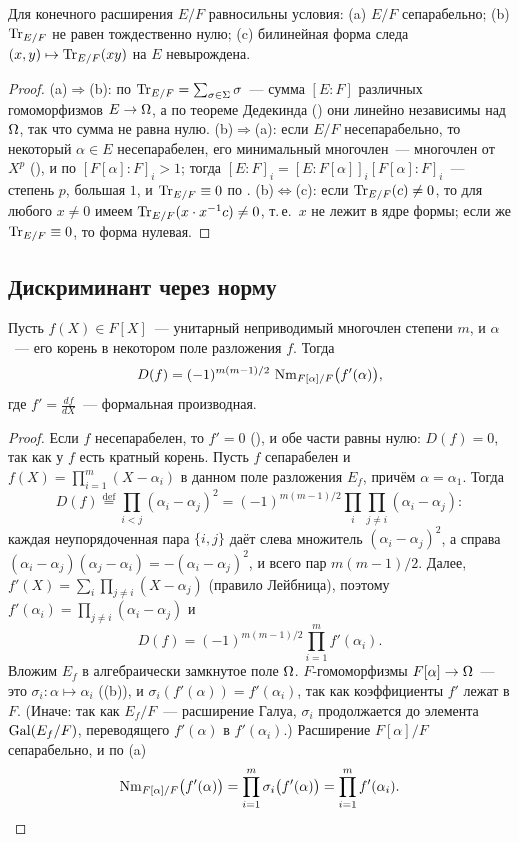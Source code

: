 \begin{corollary}[5.48c]
Для конечного расширения $E/F$ равносильны условия: (a) $E/F$ сепарабельно; (b) $\operatorname{Tr}_{E/F}$ не равен тождественно
нулю; (c) билинейная форма следа $(x,y)\mapsto\operatorname{Tr}_{E/F}(xy)$ на $E$ невырождена.
\end{corollary}

\begin{proof}
(a)$\Rightarrow$(b): по  $\operatorname{Tr}_{E/F}=\sum_{\sigma\in\Sigma}\sigma$~--- сумма $[E:F]$ различных гомоморфизмов
$E\to\Omega$, а по теореме Дедекинда () они линейно независимы над $\Omega$, так что сумма не равна нулю. (b)$\Rightarrow$(a):
если $E/F$ несепарабельно, то некоторый $\alpha\in E$ несепарабелен, его минимальный многочлен~--- многочлен от $X^p$
(), и по  $[F[\alpha]:F]_i>1$; тогда $[E:F]_i=[E:F[\alpha]]_i[F[\alpha]:F]_i$~--- степень $p$, большая $1$,
и $\operatorname{Tr}_{E/F}\equiv0$ по . (b)$\Leftrightarrow$(c): если $\operatorname{Tr}_{E/F}(c)\ne0$, то для любого $x\ne0$ имеем
$\operatorname{Tr}_{E/F}(x\cdot x^{-1}c)\ne0$, т.\,е.\ $x$ не лежит в ядре формы; если же $\operatorname{Tr}_{E/F}\equiv0$, то форма нулевая.
\end{proof}

\subsection*{Дискриминант через норму}

\begin{proposition}[5.49]
Пусть $f(X)\in F[X]$~--- унитарный неприводимый многочлен степени $m$, и $\alpha$~--- его корень в некотором поле
разложения $f$. Тогда
\[
D(f)=(-1)^{m(m-1)/2}\,\operatorname{Nm}_{F[\alpha]/F}\bigl(f'(\alpha)\bigr),
\]
где $f'=\frac{df}{dX}$~--- формальная производная.
\end{proposition}

\begin{proof}
Если $f$ несепарабелен, то $f'=0$ (), и обе части равны нулю: $D(f)=0$, так как у $f$ есть кратный корень. Пусть
$f$ сепарабелен и $f(X)=\prod_{i=1}^m(X-\alpha_i)$ в данном поле разложения $E_f$, причём $\alpha=\alpha_1$. Тогда
\[
D(f)\overset{\mathrm{def}}{=}\prod_{i<j}(\alpha_i-\alpha_j)^2=(-1)^{m(m-1)/2}\prod_i\prod_{j\ne i}(\alpha_i-\alpha_j):
\]
каждая неупорядоченная пара $\{i,j\}$ даёт слева множитель $(\alpha_i-\alpha_j)^2$, а справа
$(\alpha_i-\alpha_j)(\alpha_j-\alpha_i)=-(\alpha_i-\alpha_j)^2$, и всего пар $m(m-1)/2$. Далее,
$f'(X)=\sum_i\prod_{j\ne i}(X-\alpha_j)$ (правило Лейбница), поэтому $f'(\alpha_i)=\prod_{j\ne i}(\alpha_i-\alpha_j)$ и
\[
D(f)=(-1)^{m(m-1)/2}\prod_{i=1}^mf'(\alpha_i).
\]
Вложим $E_f$ в алгебраически замкнутое поле $\Omega$. $F$-гомоморфизмы $F[\alpha]\to\Omega$~--- это $\sigma_i\colon\alpha\mapsto\alpha_i$
((b)), и $\sigma_i(f'(\alpha))=f'(\alpha_i)$, так как коэффициенты $f'$ лежат в $F$. (Иначе: так как $E_f/F$~---
расширение Галуа, $\sigma_i$ продолжается до элемента $\operatorname{Gal}(E_f/F)$, переводящего $f'(\alpha)$ в $f'(\alpha_i)$.) Расширение
$F[\alpha]/F$ сепарабельно, и по (a)
\[
\operatorname{Nm}_{F[\alpha]/F}\bigl(f'(\alpha)\bigr)=\prod_{i=1}^m\sigma_i\bigl(f'(\alpha)\bigr)=\prod_{i=1}^mf'(\alpha_i). \qedhere
\]
\end{proof}

